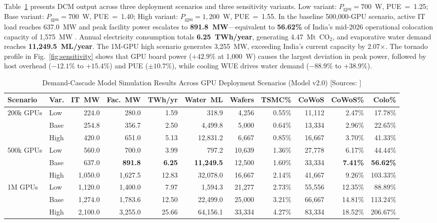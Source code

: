 \documentclass[conference]{IEEEtran}
\begin{document}
Table~\ref{tab:scenarios} presents DCM output across three deployment scenarios and three sensitivity variants. Low variant: $P_{\text{gpu}}=700$~W, PUE~=~1.25; Base variant: $P_{\text{gpu}}=700$~W, PUE~=~1.40; High variant: $P_{\text{gpu}}=1{,}200$~W, PUE~=~1.55. In the baseline 500{,}000-GPU scenario, active IT load reaches 637.0~MW and peak facility power escalates to \textbf{891.8~MW}---equivalent to \textbf{56.62\%} of India's mid-2026 operational colocation capacity of 1{,}575~MW \cite{sbicap2025datacentre,cbre2026indiadc}. Annual electricity consumption totals \textbf{6.25~TWh/year}, generating 4.47~Mt~CO$_2$, and evaporative water demand reaches \textbf{11{,}249.5~ML/year}. The 1M-GPU high scenario generates 3{,}255~MW, exceeding India's current capacity by 2.07$\times$. The tornado profile in Fig.~\ref{fig:sensitivity} shows that GPU board power ($+42.9\%$ at 1{,}000~W) causes the largest deviation in peak power, followed by host overhead ($-12.1\%$ to $+15.4\%$) and PUE ($\pm10.7\%$), while cooling WUE drives water demand ($-88.9\%$ to $+38.9\%$).

\begin{table}[t]
\centering
\caption{Demand-Cascade Model Simulation Results Across GPU Deployment Scenarios (Model v2.0) [Sources: \cite{sbicap2025datacentre,tsmc2025annual,trendforce2026foundry,lbnl2024datacenter}]}
\label{tab:scenarios}
\footnotesize
\begin{tabular*}{\textwidth}{@{\extracolsep{\fill}}llrrrrrrrrr@{}}
\toprule
\textbf{Scenario} & \textbf{Var.} & \textbf{IT~MW} & \textbf{Fac.~MW} & \textbf{TWh/yr} & \textbf{Water~ML} & \textbf{Wafers} & \textbf{TSMC\%} & \textbf{CoWoS} & \textbf{CoWoS\%} & \textbf{Colo\%} \\
\midrule
\multirow{3}{*}{200k GPUs}
 & Low  & 224.0 & 280.0 & 1.59 & 318.9 & 4{,}256 & 0.55\% & 11{,}112 & 2.47\% & 17.78\% \\
 & Base & 254.8 & 356.7 & 2.50 & 4{,}499.8 & 5{,}000 & 0.64\% & 13{,}334 & 2.96\% & 22.65\% \\
 & High & 420.0 & 651.0 & 5.13 & 12{,}831.2 & 6{,}667 & 0.85\% & 16{,}667 & 3.70\% & 41.33\% \\
\midrule
\multirow{3}{*}{500k GPUs}
 & Low  & 560.0 & 700.0 & 3.99 & 797.2 & 10{,}639 & 1.36\% & 27{,}778 & 6.17\% & 44.44\% \\
 & Base & 637.0 & \textbf{891.8} & \textbf{6.25} & \textbf{11{,}249.5} & 12{,}500 & 1.60\% & 33{,}334 & \textbf{7.41\%} & \textbf{56.62\%} \\
 & High & 1{,}050.0 & 1{,}627.5 & 12.83 & 32{,}078.0 & 16{,}667 & 2.14\% & 41{,}667 & 9.26\% & 103.33\% \\
\midrule
\multirow{3}{*}{1M GPUs}
 & Low  & 1{,}120.0 & 1{,}400.0 & 7.97 & 1{,}594.3 & 21{,}277 & 2.73\% & 55{,}556 & 12.35\% & 88.89\% \\
 & Base & 1{,}274.0 & 1{,}783.6 & 12.50 & 22{,}499.0 & 25{,}000 & 3.21\% & 66{,}667 & 14.81\% & 113.24\% \\
 & High & 2{,}100.0 & 3{,}255.0 & 25.66 & 64{,}156.1 & 33{,}334 & 4.27\% & 83{,}334 & 18.52\% & 206.67\% \\
\bottomrule
\end{tabular*}
\end{table}
\end{document}
